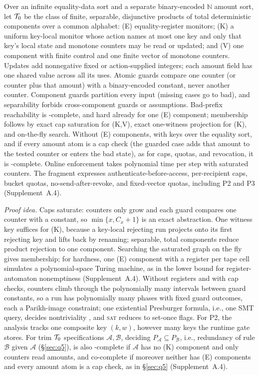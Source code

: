\begin{theorem}\label{thm:frag}
Over an infinite equality-data sort and a separate binary-encoded
$\mathbb{N}$ amount sort, let $\mathcal{T}_0$ be the class of finite, separable, disjunctive products of total
deterministic components over a common alphabet: (E) equality-register
monitors; (K) a uniform key-local monitor whose action names at most one key and only that
key's local state and monotone counters may be read or updated; and (V) one component with finite
control and one finite vector of monotone counters. Updates add nonnegative fixed or action-supplied
integers; each amount field has one shared value across all its uses. Atomic guards compare
one counter (or counter plus that amount) with a binary-encoded constant,
never another counter. Component guards partition every input (missing cases
go to bad), and separability forbids cross-component guards or assumptions.
Bad-prefix reachability is \PSPACE-complete, and hard already for one (E) component; membership
follows by exact cap saturation for (K,V), exact one-witness projection for (K), and
on-the-fly search. Without (E) components, with keys over the equality sort, and if every amount atom
is a cap check (the guarded case adds that amount to the tested counter or enters the bad state), as for
caps, quotas, and revocation, it is \NP-complete. Online enforcement takes polynomial time per step with saturated counters. The fragment
expresses authenticate-before-access, per-recipient caps, bucket quotas, no-send-after-revoke, and
fixed-vector quotas, including P2 and P3 (Supplement~A.4).
\end{theorem}

\noindent\emph{Proof idea.} Caps saturate: counters only grow and each guard compares one counter
with a constant, so $\min\{x,C_x+1\}$ is an exact abstraction. One witness key suffices for (K),
because a key-local rejecting run projects onto its first rejecting key and lifts back by renaming;
separable, total components reduce product rejection to one component. Searching the saturated
graph on the fly gives membership; for hardness, one (E) component with a register per tape cell
simulates a polynomial-space Turing machine, as in the \PSPACE{} lower bound for register-automaton nonemptiness \citep{demri2009ltl} (Supplement~A.4).
Without registers and with cap checks, counters climb through the polynomially many intervals between guard constants,
so a run has polynomially many phases with fixed guard outcomes, each a Parikh-image constraint;
one existential Presburger formula, i.e., one SMT query, decides nontriviality
\citep{verma2005parikh,scarpellini1984presburger}, and \textsc{sat} reduces to set-once flags. For P2,
the analysis tracks one composite key $(k,w)$, however many keys the runtime gate stores.
For trim $\mathcal{T}_0$ specifications $\mathcal A,\mathcal B$, deciding $P_{\mathcal A}\subseteq P_{\mathcal B}$, i.e., redundancy of rule $\mathcal B$ given $\mathcal A$
(\S\ref{sec:q5}), is also \PSPACE-complete if $\mathcal A$ has no (K) component and only counters read amounts, and co\NP-complete if moreover
neither has (E) components and every amount atom is a cap check, as in \S\ref{sec:q5} (Supplement~A.4).


